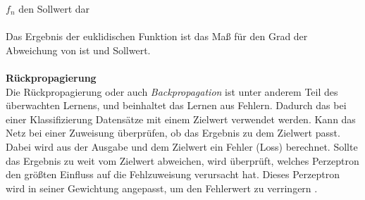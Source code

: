 \documentclass[a4paper,12pt,oneside]{article}
\begin{document}
	$f_{n}$ den Sollwert dar\\\\
Das Ergebnis der euklidischen Funktion ist das Maß für den Grad der Abweichung von ist und Sollwert.\\\\
\textbf{Rückpropagierung}\\
Die Rückpropagierung oder auch \textit{Backpropagation} \cite{ertel2013grundkurs} ist unter anderem Teil des überwachten Lernens, und beinhaltet das Lernen aus Fehlern. Dadurch das bei einer Klassifizierung Datensätze mit einem Zielwert verwendet werden. Kann das Netz bei einer Zuweisung überprüfen, ob das Ergebnis zu dem Zielwert passt. Dabei wird aus der Ausgabe und dem Zielwert ein Fehler (Loss) berechnet. Sollte das Ergebnis zu weit vom Zielwert abweichen, wird überprüft, welches Perzeptron den größten Einfluss auf die Fehlzuweisung verursacht hat. Dieses Perzeptron wird in seiner Gewichtung angepasst, um den Fehlerwert zu verringern \cite{goodfellow2016deep}.  
\end{document}
